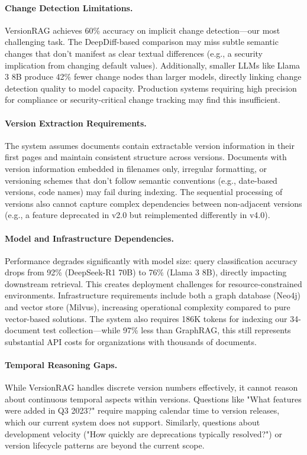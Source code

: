 \documentclass[11pt]{article}
\begin{document}
\paragraph{Change Detection Limitations.}
VersionRAG achieves 60\% accuracy on implicit change detection—our most challenging task. The DeepDiff-based comparison may miss subtle semantic changes that don't manifest as clear textual differences (e.g., a security implication from changing default values). Additionally, smaller LLMs like Llama 3 8B produce 42\% fewer change nodes than larger models, directly linking change detection quality to model capacity. Production systems requiring high precision for compliance or security-critical change tracking may find this insufficient.

\paragraph{Version Extraction Requirements.}
The system assumes documents contain extractable version information in their first pages and maintain consistent structure across versions. Documents with version information embedded in filenames only, irregular formatting, or versioning schemes that don't follow semantic conventions (e.g., date-based versions, code names) may fail during indexing. The sequential processing of versions also cannot capture complex dependencies between non-adjacent versions (e.g., a feature deprecated in v2.0 but reimplemented differently in v4.0).

\paragraph{Model and Infrastructure Dependencies.}
Performance degrades significantly with model size: query classification accuracy drops from 92\% (DeepSeek-R1 70B) to 76\% (Llama 3 8B), directly impacting downstream retrieval. This creates deployment challenges for resource-constrained environments. Infrastructure requirements include both a graph database (Neo4j) and vector store (Milvus), increasing operational complexity compared to pure vector-based solutions. The system also requires 186K tokens for indexing our 34-document test collection—while 97\% less than GraphRAG, this still represents substantial API costs for organizations with thousands of documents.

\paragraph{Temporal Reasoning Gaps.}
While VersionRAG handles discrete version numbers effectively, it cannot reason about continuous temporal aspects within versions. Questions like "What features were added in Q3 2023?" require mapping calendar time to version releases, which our current system does not support. Similarly, questions about development velocity ("How quickly are deprecations typically resolved?") or version lifecycle patterns are beyond the current scope.
\end{document}
